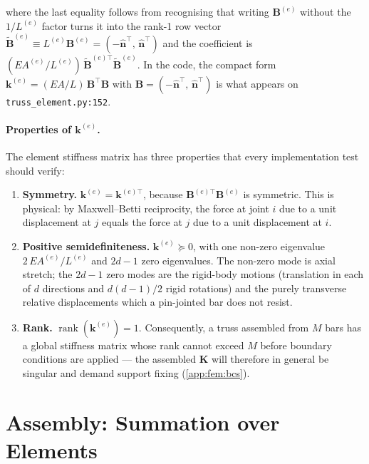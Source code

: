 where the last equality follows from recognising that writing
$\mathbf{B}^{(e)}$ without the $1/L^{(e)}$ factor turns it into
the rank-1 row vector
$\tilde{\mathbf{B}}^{(e)}\equiv L^{(e)}\mathbf{B}^{(e)}=
(-\hat{\mathbf{n}}^\top,\,\hat{\mathbf{n}}^\top)$ and the
coefficient is $(EA^{(e)}/L^{(e)})\,\tilde{\mathbf{B}}^{(e)\top}
\tilde{\mathbf{B}}^{(e)}$. In the code, the compact form
$\mathbf{k}^{(e)}=(EA/L)\,\mathbf{B}^\top\mathbf{B}$ with
$\mathbf{B}=(-\hat{\mathbf{n}}^\top,\,\hat{\mathbf{n}}^\top)$ is
what appears on \texttt{truss\_element.py:152}.

\paragraph{Properties of $\mathbf{k}^{(e)}$.} The element
stiffness matrix has three properties that every implementation
test should verify:
\begin{enumerate}
  \item \textbf{Symmetry.} $\mathbf{k}^{(e)}=\mathbf{k}^{(e)\top}$,
    because $\mathbf{B}^{(e)\top}\mathbf{B}^{(e)}$ is symmetric.
    This is physical: by Maxwell--Betti reciprocity, the force at
    joint $i$ due to a unit displacement at $j$ equals the force
    at $j$ due to a unit displacement at $i$.
  \item \textbf{Positive semidefiniteness.}
    $\mathbf{k}^{(e)}\succeq 0$, with one non-zero eigenvalue
    $2\,EA^{(e)}/L^{(e)}$ and $2d-1$ zero eigenvalues. The non-zero
    mode is axial stretch; the $2d-1$ zero modes are the rigid-body
    motions (translation in each of $d$ directions and
    $d(d-1)/2$ rigid rotations) and the purely transverse
    relative displacements which a pin-jointed bar does not resist.
  \item \textbf{Rank.} $\operatorname{rank}(\mathbf{k}^{(e)})=1$.
    Consequently, a truss assembled from $M$ bars has a global
    stiffness matrix whose rank cannot exceed $M$ before boundary
    conditions are applied — the assembled $\mathbf{K}$ will
    therefore in general be singular and demand support fixing
    (\cref{app:fem:bcs}).
\end{enumerate}

\section{Assembly: Summation over Elements}
\label{app:fem:assembly}

